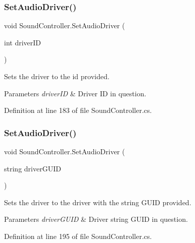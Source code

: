 \subsubsection{\texorpdfstring{Set\+Audio\+Driver()}{SetAudioDriver()}\hspace{0.1cm}{\footnotesize\ttfamily [1/3]}}
{\footnotesize\ttfamily void Sound\+Controller.\+Set\+Audio\+Driver (\begin{DoxyParamCaption}\item[{int}]{driver\+ID }\end{DoxyParamCaption})}



Sets the driver to the id provided. 


\begin{DoxyParams}{Parameters}
{\em driver\+ID} & Driver ID in question. \\
\hline
\end{DoxyParams}


Definition at line 183 of file Sound\+Controller.\+cs.

\mbox{\label{class_sound_controller_a4b11e23078dd1fb410f3db69f43758ea}} 
\subsubsection{\texorpdfstring{Set\+Audio\+Driver()}{SetAudioDriver()}\hspace{0.1cm}{\footnotesize\ttfamily [2/3]}}
{\footnotesize\ttfamily void Sound\+Controller.\+Set\+Audio\+Driver (\begin{DoxyParamCaption}\item[{string}]{driver\+G\+U\+ID }\end{DoxyParamCaption})}



Sets the driver to the driver with the string G\+U\+ID provided. 


\begin{DoxyParams}{Parameters}
{\em driver\+G\+U\+ID} & Driver string G\+U\+ID in question. \\
\hline
\end{DoxyParams}


Definition at line 195 of file Sound\+Controller.\+cs.

\mbox{\label{class_sound_controller_a544d8f6cf926ce1ca11ecbab5418b1e1}} 
